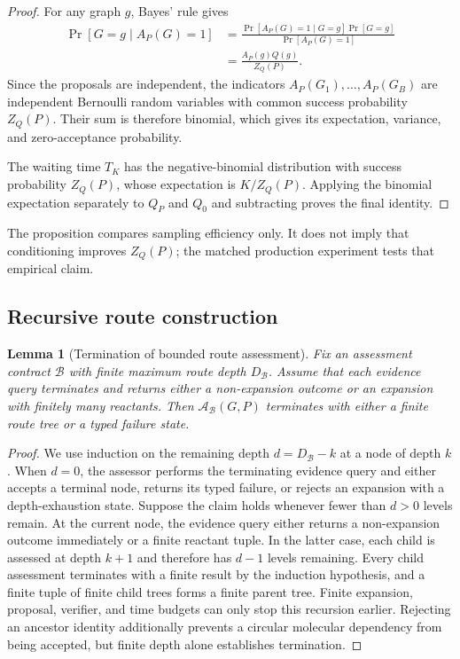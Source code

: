 \documentclass{article}
\newtheorem{lemma}[theorem]{Lemma}
\begin{document}
\begin{proof}
For any graph $g$, Bayes' rule gives
\begin{align}
    \Pr[G=g\mid A_P(G)=1]
    &=
    \frac{
        \Pr[A_P(G)=1\mid G=g]\Pr[G=g]
    }{
        \Pr[A_P(G)=1]
    }\\
    &=
    \frac{A_P(g)Q(g)}{Z_Q(P)}.
\end{align}
Since the proposals are independent, the indicators
$A_P(G_1),\ldots,A_P(G_B)$ are independent Bernoulli random variables with common success
probability $Z_Q(P)$.
Their sum is therefore binomial, which gives its expectation, variance, and zero-acceptance
probability.

The waiting time $T_K$ has the negative-binomial distribution with success probability $Z_Q(P)$,
whose expectation is $K/Z_Q(P)$.
Applying the binomial expectation separately to $Q_P$ and $Q_0$ and subtracting proves the final
identity.
\end{proof}

The proposition compares sampling efficiency only.
It does not imply that conditioning improves $Z_Q(P)$; the matched production experiment tests that
empirical claim.

\subsection{Recursive route construction}

\begin{lemma}[Termination of bounded route assessment]
\label{lem:planner-termination}
Fix an assessment contract $\mathcal{B}$ with finite maximum route depth $D_{\mathcal{B}}$.
Assume that each evidence query terminates and returns either a non-expansion outcome or an expansion
with finitely many reactants.
Then $\mathcal{A}_{\mathcal{B}}(G,P)$ terminates with either a finite route tree or a typed failure
state.
\end{lemma}

\begin{proof}
We use induction on the remaining depth $d=D_{\mathcal{B}}-k$ at a node of depth $k$.
When $d=0$, the assessor performs the terminating evidence query and either accepts a terminal node,
returns its typed failure, or rejects an expansion with a depth-exhaustion state.
Suppose the claim holds whenever fewer than $d>0$ levels remain.
At the current node, the evidence query either returns a non-expansion outcome immediately or a
finite reactant tuple.
In the latter case, each child is assessed at depth $k+1$ and therefore has $d-1$ levels remaining.
Every child assessment terminates with a finite result by the induction hypothesis, and a finite
tuple of finite child trees forms a finite parent tree.
Finite expansion, proposal, verifier, and time budgets can only stop this recursion earlier.
Rejecting an ancestor identity additionally prevents a circular molecular dependency from being
accepted, but finite depth alone establishes termination.
\end{proof}
\end{document}
